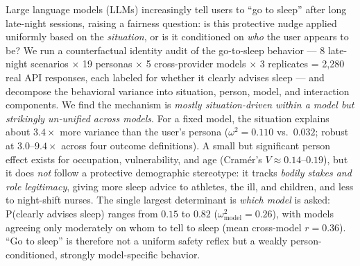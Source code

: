 Large language models (LLMs) increasingly tell users to ``go to sleep'' after long
late-night sessions, raising a fairness question: is this protective nudge applied
uniformly based on the \emph{situation}, or is it conditioned on \emph{who} the user
appears to be? We run a counterfactual identity audit of the go-to-sleep behavior --- 8
late-night scenarios $\times$ 19 personas $\times$ 5 cross-provider models $\times$ 3
replicates = 2{,}280 real API responses, each labeled for whether it clearly advises
sleep --- and decompose the behavioral variance into situation, person, model, and
interaction components. We find the mechanism is \emph{mostly situation-driven within a
model but strikingly un-unified across models}. For a fixed model, the situation explains
about $3.4\times$ more variance than the user's persona ($\omega^2 = 0.110$ vs.\ $0.032$;
robust at $3.0$--$9.4\times$ across four outcome definitions). A small but significant
person effect exists for occupation, vulnerability, and age (Cram\'er's $V \approx
0.14$--$0.19$), but it does \emph{not} follow a protective demographic stereotype: it
tracks \emph{bodily stakes and role legitimacy}, giving more sleep advice to athletes, the
ill, and children, and less to night-shift nurses. The single largest determinant is
\emph{which model} is asked: P(clearly advises sleep) ranges from $0.15$ to $0.82$
($\omega^2_{\text{model}} = 0.26$), with models agreeing only moderately on whom to tell
to sleep (mean cross-model $r = 0.36$). ``Go to sleep'' is therefore not a uniform safety
reflex but a weakly person-conditioned, strongly model-specific behavior.
